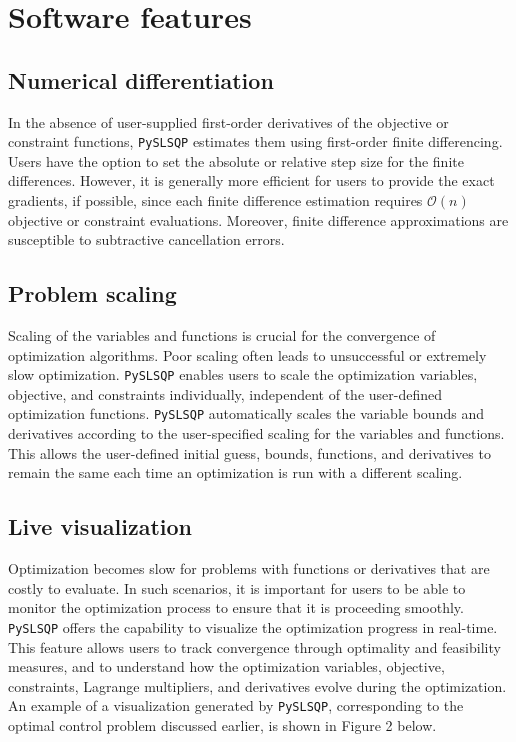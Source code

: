 \documentclass[
]{article}
\begin{document}
\section{Software features}\label{software-features}

\subsection{Numerical differentiation}\label{numerical-differentiation}

In the absence of user-supplied first-order derivatives of the objective
or constraint functions, \texttt{PySLSQP} estimates them using
first-order finite differencing. Users have the option to set the
absolute or relative step size for the finite differences. However, it
is generally more efficient for users to provide the exact gradients, if
possible, since each finite difference estimation requires
\(\mathcal{O}(n)\) objective or constraint evaluations. Moreover, finite
difference approximations are susceptible to subtractive cancellation
errors.

\subsection{Problem scaling}\label{problem-scaling}

Scaling of the variables and functions is crucial for the convergence of
optimization algorithms. Poor scaling often leads to unsuccessful or
extremely slow optimization. \texttt{PySLSQP} enables users to scale the
optimization variables, objective, and constraints individually,
independent of the user-defined optimization functions. \texttt{PySLSQP}
automatically scales the variable bounds and derivatives according to
the user-specified scaling for the variables and functions. This allows
the user-defined initial guess, bounds, functions, and derivatives to
remain the same each time an optimization is run with a different
scaling.

\subsection{Live visualization}\label{live-visualization}

Optimization becomes slow for problems with functions or derivatives
that are costly to evaluate. In such scenarios, it is important for
users to be able to monitor the optimization process to ensure that it
is proceeding smoothly. \texttt{PySLSQP} offers the capability to
visualize the optimization progress in real-time. This feature allows
users to track convergence through optimality and feasibility measures,
and to understand how the optimization variables, objective,
constraints, Lagrange multipliers, and derivatives evolve during the
optimization. An example of a visualization generated by
\texttt{PySLSQP}, corresponding to the optimal control problem discussed
earlier, is shown in Figure 2 below.
\end{document}
